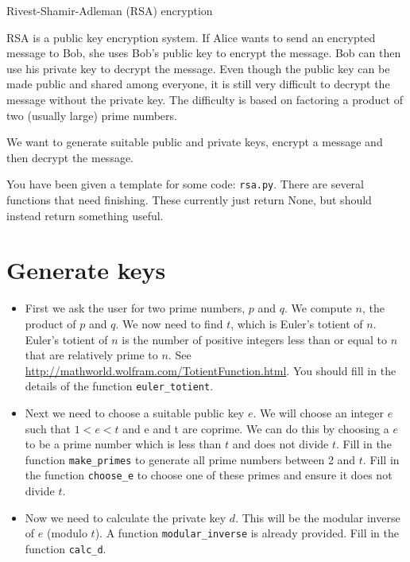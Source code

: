 \documentclass[a4paper]{article}
\begin{document}
\begin{center}
    {\huge{Rivest-Shamir-Adleman (RSA) encryption}}\\

\end{center}

\vskip 0.5cm

RSA is a public key encryption system. If Alice wants to send an
encrypted message to Bob, she uses Bob's public key to encrypt the
message. Bob can then use his private key to decrypt the message. Even
though the public key can be made public and shared among everyone, it
is still very difficult to decrypt the message without the private
key. The difficulty is based on factoring a product of two (usually
large) prime numbers.

We want to generate suitable public and private keys, encrypt a message and
then decrypt the message.

You have been given a template for some code: \texttt{rsa.py}. There
are several functions that need finishing. These currently just return
None, but should instead return something useful.

\section*{Generate keys}
\begin{itemize}
\item First we ask the user for two prime numbers, $p$ and $q$. We compute $n$, the product
of $p$ and $q$. We now need to find $t$, which is Euler's totient of $n$. Euler's
totient of $n$ is the number of positive integers less than or equal to $n$
that are relatively prime to $n$. See
\url{http://mathworld.wolfram.com/TotientFunction.html}. You should
fill in the details of the function \texttt{euler\_totient}. 

\item Next we need to choose a suitable public key $e$. 
  We will choose an integer $e$ such that $1
  < e < t$ and e and t are coprime. We can do this by choosing a
  $e$ to be a prime number which is less than $t$ and does not divide
  $t$. Fill in the function \texttt{make\_primes} to generate all
  prime numbers between 2 and $t$. Fill in the function
  \texttt{choose\_e} to choose one of these primes and ensure it does
  not divide $t$.

\item Now we need to calculate the private key $d$. This will be the
  modular inverse of $e$ (modulo $t$). A function
  \texttt{modular\_inverse} is already provided. Fill in the function \texttt{calc\_d}.

\end{itemize}
\end{document}
